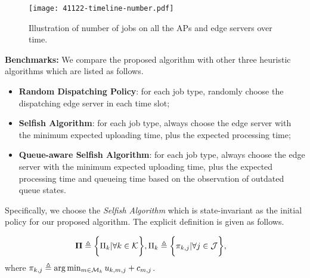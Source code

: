 \begin{figure*}[ht!]                                                                            %
    \centering                                                                                  %
    \texttt{[image: 41122-timeline-number.pdf]}                           %
    \caption{Illustration of number of jobs on all the APs and edge servers over time.}         %
    \label{fig:general_timeline}                                                                %
\end{figure*}                                                                                   %

\textbf{Benchmarks:}
We compare the proposed algorithm with other three heuristic algorithms which are listed as follows.
\begin{itemize}
    \item \textbf{Random Dispatching Policy}:
            for each job type, randomly choose the dispatching edge server in each time slot; 
    \item \textbf{Selfish Algorithm}:
            for each job type, always choose the edge server with the minimum expected uploading time, plus the expected processing time;
    \item \textbf{Queue-aware Selfish Algorithm}:
            for each job type, always choose the edge server with the minimum expected uploading time, plus the expected processing time and queueing time based on the observation of outdated queue states.
\end{itemize}
Specifically, we choose the \emph{Selfish Algorithm} which is state-invariant as the initial policy for our proposed algorithm.
The explicit definition is given as follows.
\begin{policy}
    \begin{align}
        \boldsymbol{\Pi} &\triangleq \bigg\{ \Pi_{k} |\forall k\in\mathcal{K} \bigg\},
        \Pi_{k} \triangleq \bigg\{\pi_{k,j}|\forall j\in\mathcal{J}\bigg\},
    \end{align}
    where $\pi_{k,j} \triangleq \arg\min_{m\in\mathcal{M}_{k}} u_{k,m,j} + c_{m,j}$.
\end{policy}

